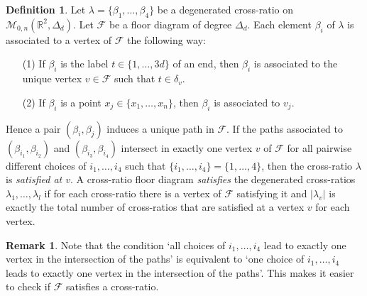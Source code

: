 \documentclass[11pt,reqno,a4]{amsart}
\theoremstyle{dotless}
\theoremstyle{definition}
\newtheorem{definition}[corollary]{Definition}
\newtheorem{remark}[corollary]{Remark}
\begin{document}
\begin{definition}\label{definition:floor_diag_satisfies_CRC}
Let $\lambda=\lbrace \beta_1,\dots,\beta_4 \rbrace$ be a degenerated cross-ratio on $\mathcal{M}_{0,n}\left(\mathbb{R}^2,\Delta_d \right)$. Let $\mathcal{F}$ be a floor diagram of degree $\Delta_d$. Each element $\beta_i$ of $\lambda$ is associated to a vertex of $\mathcal{F}$ the following way: 
\begin{itemize}
\item[(1)]
If $\beta_i$ is the label $t\in\lbrace 1,\dots,3d\rbrace$ of an end, then $\beta
_i$ is associated to the unique vertex $v\in\mathcal{F}$ such that $t\in\delta_v$.
\item[(2)]
If $\beta_i$ is a point $x_j\in\lbrace x_1,\dots,x_n\rbrace$, then $\beta_i$ is associated to $v_j$.
\end{itemize}
Hence a pair $\left( \beta_i,\beta_j\right)$ induces a unique path in $\mathcal{F}$. If the paths associated to $\left( \beta_{i_1},\beta_{i_2} \right)$ and $\left( \beta_{i_3},\beta_{i_4} \right)$ intersect in exactly one vertex $v$ of $\mathcal{F}$ for all pairwise different choices of $i_1,\dots,i_4$ such that $\lbrace i_1,\dots,i_4 \rbrace =\lbrace 1,\dots,4 \rbrace$, then the cross-ratio $\lambda$ is \textit{satisfied at $v$}. A cross-ratio floor diagram \textit{satisfies} the degenerated cross-ratios $\lambda_1,\dots,\lambda_l$ if for each cross-ratio there is a vertex of $\mathcal{F}$ satisfying it and $|\lambda_v|$ is exactly the total number of cross-ratios that are satisfied at a vertex $v$ for each vertex.
\end{definition}

\begin{remark}
Note that the condition `all choices of $i_1,\dots,i_4$ lead to exactly one vertex in the intersection of the paths' is equivalent to `one choice of $i_1,\dots,i_4$ leads to exactly one vertex in the intersection of the paths'. This makes it easier to check if $\mathcal{F}$ satisfies a cross-ratio.
\end{remark}
\end{document}
